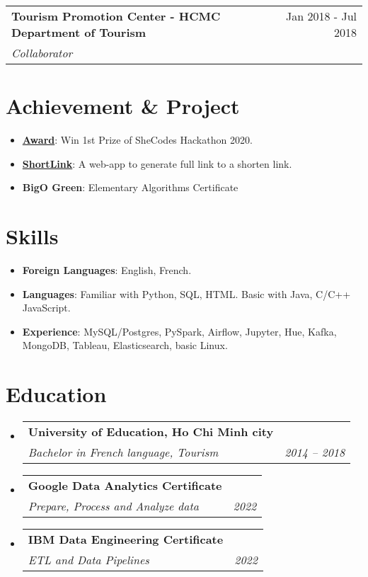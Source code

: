 \documentclass[letterpaper,11pt]{article}
\makeatletter
\newcommand{\resumeItem}[2]{
  \item\small{
    \textbf{#1}{: #2 \vspace{-2pt}}
  }
}
\newcommand{\resumeSubheading}[4]{
  \vspace{-1pt}
  \item
    \begin{tabular*}{0.97\textwidth}{l@{\extracolsep{\fill}}r}
      \textbf{#1} & #2 \\
      \textit{\small#3} & \textit{\small #4} \\
    \end{tabular*}\vspace{-5pt}
}
\newcommand{\resumeSubItem}[2]{\resumeItem{#1}{#2}\vspace{-4pt}}
\newcommand{\resumeSubHeadingListStart}{\begin{itemize}[leftmargin=*]}
\newcommand{\resumeSubHeadingListEnd}{\end{itemize}}
\newcommand{\resumeItemListStart}{\begin{itemize}}
\newcommand{\resumeItemListEnd}{\end{itemize}\vspace{-5pt}}
\makeatother
\begin{document}
    \resumeSubheading
      {Tourism Promotion Center - HCMC Department of Tourism}{Jan 2018 - Jul 2018}
      {Collaborator}
\resumeSubHeadingListEnd
  
  
\section{Achievement \& Project}
  \resumeSubHeadingListStart 
    \resumeSubItem{\href{}{Award}}
      {Win 1st Prize of SheCodes Hackathon 2020. }
    \resumeSubItem{\href{https://github.com/tuyen-nnt/shortenLink}{ShortLink}}
      {A web-app to generate full link to a shorten link.}
    \resumeSubItem{BigO Green}
      {Elementary Algorithms Certificate}
\resumeSubHeadingListEnd


\section{Skills}
  \resumeSubHeadingListStart
    \resumeSubItem{Foreign Languages}
      {English, French.}
    \resumeSubItem{Languages}
      {Familiar with Python, SQL, HTML. Basic with Java, C/C++ JavaScript.}
    \resumeSubItem{Experience}
      {MySQL/Postgres, PySpark, Airflow, Jupyter, Hue, Kafka, MongoDB, Tableau, Elasticsearch, basic Linux.}
\resumeSubHeadingListEnd

\section{Education}
  \resumeSubHeadingListStart
    \resumeSubheading
      {University of Education, Ho Chi Minh city}{}
      {Bachelor in French language, Tourism}{2014 -- 2018}
    \resumeSubheading
      {Google Data Analytics Certificate}{}
      {Prepare, Process and Analyze data}{2022}%
    \resumeSubheading
      {IBM Data Engineering Certificate}{}  
      {ETL and Data Pipelines}{2022}%
  \resumeSubHeadingListEnd
\end{document}
